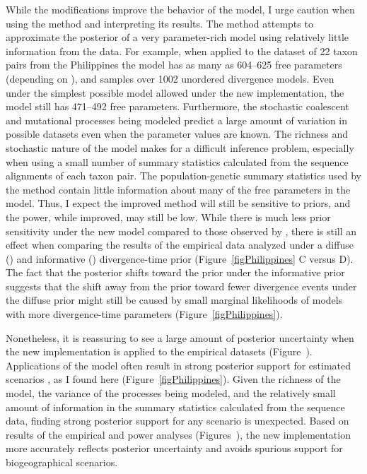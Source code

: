 While the modifications improve the behavior of the model, I urge caution when
using the method and interpreting its results.
The method attempts to approximate the posterior of a very parameter-rich model
using relatively little information from the data.
For example, when applied to the dataset of 22 taxon pairs from the Philippines
\cite{Oaks2012} the model has as many as 604--625 free parameters
(depending on \divTimeNum), and samples over 1002 unordered divergence models.
Even under the simplest possible model allowed under the new implementation,
the model still has 471--492 free parameters.
Furthermore, the stochastic coalescent and mutational processes being modeled
predict a large amount of variation in possible datasets even when the
parameter values are known.
The richness and stochastic nature of the model makes for a difficult inference
problem, especially when using a small number of summary statistics calculated
from the sequence alignments of each taxon pair.
The population-genetic summary statistics used by the method contain little
information about many of the free parameters in the model.
Thus, I expect the improved method will still be sensitive to priors, and the
power, while improved, may still be low.
While there is much less prior sensitivity under the new model compared to
those observed by \cite{Oaks2012}, there is still an effect when comparing the
results of the empirical data analyzed under a diffuse (\empModelDPP) and
informative (\empModelDPPInform) divergence-time prior
(Figure~\ref{figPhilippines} C versus D).
The fact that the posterior shifts toward the prior under the informative prior
suggests that the shift away from the prior toward fewer divergence events
under the diffuse prior might still be caused by small marginal likelihoods
of models with more divergence-time parameters (Figure~\ref{figPhilippines}).

Nonetheless, it is reassuring to see a large amount of posterior uncertainty
when the new implementation is applied to the empirical datasets
(Figure~).
Applications of the \msb model often result in strong posterior support for
estimated scenarios
\cite{Barber2010,Carnaval2009,Chan2011,Hickerson2006,Leache2007,Plouviez2009,Stone2012,Voje2009,Oaks2012},
as I found here (Figure~\ref{figPhilippines}).
Given the richness of the model, the variance of the processes being modeled,
and the relatively small amount of information in the summary statistics
calculated from the sequence data, finding strong posterior support for any
scenario is unexpected.
Based on results of the empirical and power analyses
(Figures~),
the new implementation more accurately reflects posterior uncertainty and
avoids spurious support for biogeographical scenarios.

